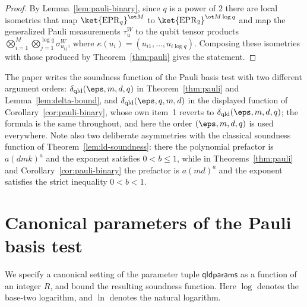 \begin{proof}
	\leanok
	By Lemma~\ref{lem:pauli-binary}, since $q$ is a power of $2$ there are local isometries that map $\ket{\mathrm{EPR}_q}^{\ot M}$ to $\ket{\mathrm{EPR}_2}^{\ot M \log q}$ and map the generalized Pauli measurements $\tau^W_u$ to the qubit tensor products $\bigotimes_{i=1}^M \bigotimes_{j=1}^{\log q} \sigma^W_{u_{ij}}$, where $\kappa(u_i) = (u_{i1},\ldots,u_{i \log q})$. Composing these isometries with those produced by Theorem~\ref{thm:pauli} gives the statement.
\end{proof}

\begin{remark}\label{rem:delta-qld-argument-order}
	The paper writes the soundness function of the Pauli basis test with two different argument orders: $\delta_{\mathrm{qld}}(\eps, m, d, q)$ in Theorem~\ref{thm:pauli} and Lemma~\ref{lem:delta-bound}, and $\delta_{\mathrm{qld}}(\eps, q, m, d)$ in the displayed function of Corollary~\ref{cor:pauli-binary}, whose own item~1 reverts to $\delta_{\mathrm{qld}}(\eps, m, d, q)$; the formula is the same throughout, and here the order $(\eps, m, d, q)$ is used everywhere. Note also two deliberate asymmetries with the classical soundness function of Theorem~\ref{lem:ld-soundness}: there the polynomial prefactor is $a(dmk)^a$ and the exponent satisfies $0 < b \le 1$, while in Theorems~\ref{thm:pauli} and Corollary~\ref{cor:pauli-binary} the prefactor is $a(md)^a$ and the exponent satisfies the strict inequality $0 < b < 1$.
\end{remark}

\section{Canonical parameters of the Pauli basis test}
\label{sec:qld-complexity}

We specify a canonical setting of the parameter tuple $\mathsf{qldparams}$ as a function of an integer $R$, and bound the resulting soundness function. Here $\log$ denotes the base-two logarithm, and $\ln$ denotes the natural logarithm.

